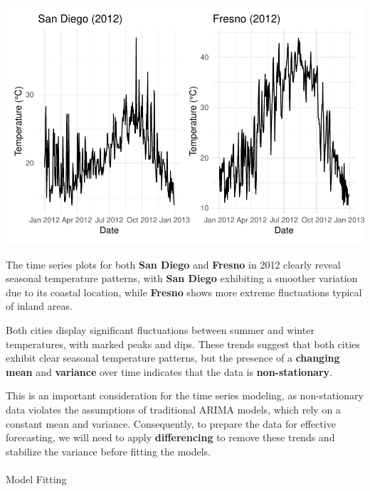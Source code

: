 \documentclass[
  11pt,
]{article}
\makeatletter
\let\oldparagraph\paragraph
\renewcommand{\paragraph}{
    \@ifstar
      \xxxParagraphStar
      \xxxParagraphNoStar
  }
\newcommand{\xxxParagraphStar}[1]{\oldparagraph*{#1}\mbox{}}
\newcommand{\xxxParagraphNoStar}[1]{\oldparagraph{#1}\mbox{}}
\makeatother
\begin{document}
\includegraphics{project_files/figure-pdf/unnamed-chunk-84-1.pdf}

The time series plots for both \textbf{San Diego} and \textbf{Fresno} in
2012 clearly reveal seasonal temperature patterns, with \textbf{San
Diego} exhibiting a smoother variation due to its coastal location,
while \textbf{Fresno} shows more extreme fluctuations typical of inland
areas.

Both cities display significant fluctuations between summer and winter
temperatures, with marked peaks and dips. These trends suggest that both
cities exhibit clear seasonal temperature patterns, but the presence of
a \textbf{changing mean} and \textbf{variance} over time indicates that
the data is \textbf{non-stationary}.

This is an important consideration for the time series modeling, as
non-stationary data violates the assumptions of traditional ARIMA
models, which rely on a constant mean and variance. Consequently, to
prepare the data for effective forecasting, we will need to apply
\textbf{differencing} to remove these trends and stabilize the variance
before fitting the models.

\paragraph{Model Fitting}\label{model-fitting}
\end{document}
